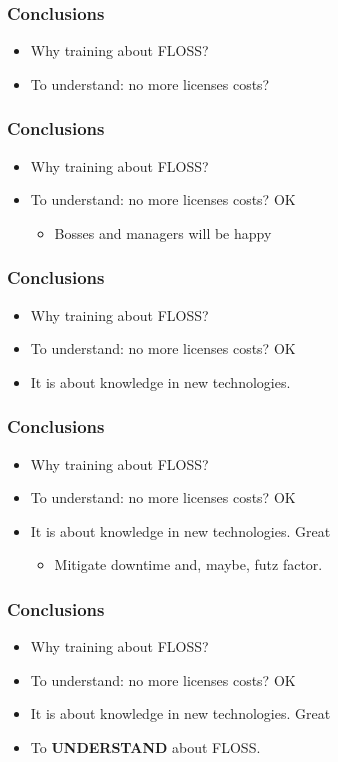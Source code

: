\documentclass{beamer}
\begin{document}
\begin{frame}
\frametitle{Conclusions}
\begin{itemize}
\item Why training about FLOSS?
\item To understand: no more licenses costs? 
\end{itemize}
\end{frame}


\begin{frame}
\frametitle{Conclusions}
\begin{itemize}
\item Why training about FLOSS?
\item To understand: no more licenses costs? OK
\begin{itemize}
	\item Bosses and managers will be happy
\end{itemize}
\end{itemize}
\end{frame}

\begin{frame}
\frametitle{Conclusions}
\begin{itemize}
\item Why training about FLOSS?
\item To understand: no more licenses costs? OK
\item It is about knowledge in new technologies.
\end{itemize}
\end{frame}

\begin{frame}
\frametitle{Conclusions}
\begin{itemize}
\item Why training about FLOSS?
\item To understand: no more licenses costs? OK
\item It is about knowledge in new technologies. Great
\begin{itemize}
	\item Mitigate downtime and, maybe, futz factor.
\end{itemize}
\end{itemize}
\end{frame}


\begin{frame}
\frametitle{Conclusions}
\begin{itemize}
\item Why training about FLOSS?
\item To understand: no more licenses costs? OK
\item It is about knowledge in new technologies. Great
\item To \textbf{UNDERSTAND} about FLOSS. 
\end{itemize}
\end{frame}
\end{document}
